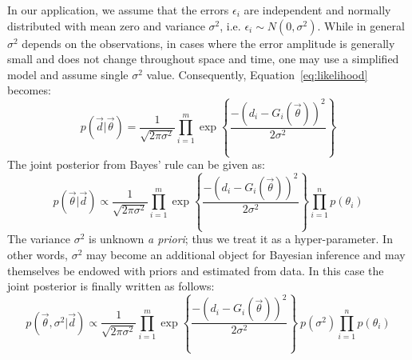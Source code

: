 In our application, we assume that the errors $\epsilon_i$ are independent
and normally distributed with mean
zero and variance $\sigma^2$, i.e. 
$\epsilon_i \sim N(0,\sigma^2)$. 
While in general $\sigma^2$ depends on the observations, in cases where the error
amplitude is generally small and does not change throughout space and time, one may use
a simplified model and assume single $\sigma^2$ value.
Consequently, Equation~\ref{eq:likelihood} becomes:
\begin{equation} 
p(\vec d |  \vec{\theta}) 
= 
\frac{1}{\sqrt{2 \pi \sigma^2}}\prod_{i=1}^m   
\exp \left\lbrace \frac{-(d_i - G_i(\vec \theta))^2}{2 \sigma^2} \right\rbrace 	
\label{eq:likelihood2}
\end{equation}
The joint posterior from Bayes' rule can be given as:
\begin{equation} 
p(\vec{\theta}| \vec d)
\propto
\frac{1}{\sqrt{2 \pi \sigma^2}}   \prod_{i=1}^m  
\exp \left\lbrace \frac{-(d_i - G_i(\vec \theta))^2}{2 \sigma^2} \right\rbrace  
\prod_{i=1}^n p(\theta_i)
\end{equation}
The variance $\sigma^2$ is unknown \emph{a priori}; thus we treat it as a hyper-parameter.
In other words, $\sigma^2$ may become an additional object for Bayesian inference and may themselves be endowed with priors and estimated from data. In this case the joint posterior is finally written as follows:
\begin{equation} 
p(\vec{\theta},\sigma^2 | \vec d)
\propto
\frac{1}{\sqrt{2 \pi \sigma^2}}   \prod_{i=1}^m  
\exp \left\lbrace \frac{-(d_i - G_i(\vec \theta))^2}{2 \sigma^2} \right\rbrace
\ p(\sigma^2) \prod_{i=1}^n p(\theta_i)
\label{eq:post}
\end{equation}

